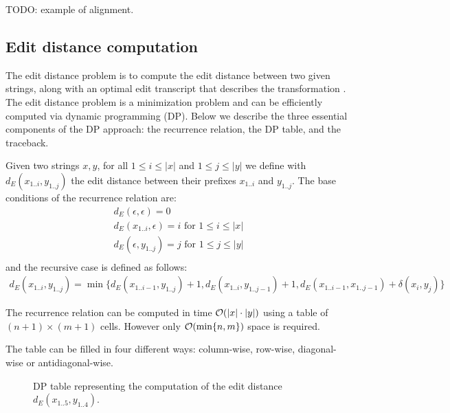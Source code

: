 \begin{example}
TODO: example of alignment.
\end{example}


\subsection{Edit distance computation}

The edit distance problem is to compute the edit distance between two given strings, along with an optimal edit transcript that describes the transformation \cite{Gusfield1997}.
The edit distance problem is a minimization problem and can be efficiently computed via dynamic programming (DP). Below we describe the three essential components of the DP approach: the recurrence relation, the DP table, and the traceback.

Given two strings $x,y$, for all $1 \leq i \leq | x |$ and $1 \leq j \leq | y |$ we define with $d_E(x_{1..i},y_{1..j})$ the edit distance between their prefixes $x_{1..i}$ and $y_{1..j}$.
The base conditions of the recurrence relation are:
\begin{eqnarray}
d_E(\epsilon,\epsilon) = 0\\
d_E(x_{1..i},\epsilon) = i \text{ for } 1 \leq i \leq |x|\\
d_E(\epsilon, y_{1..j}) = j \text{ for } 1 \leq j \leq |y|\\
\end{eqnarray}
and the recursive case is defined as follows:
\begin{eqnarray}
d_E(x_{1..i},y_{1..j}) = \min \{ d_E(x_{1..i-1},y_{1..j})+1, d_E(x_{1..i},y_{1..j-1})+1, d_E(x_{1..i-1},x_{1..j-1}) + \delta(x_i, y_j)\}
\end{eqnarray}

The recurrence relation can be computed in time $\mathcal{O}(| x | \cdot | y |)$ using a table of $(n+1) \times (m+1)$ cells. However only $\mathcal{O}(\text{min}\{ n, m \})$ space is required.

The table can be filled in four different ways: column-wise, row-wise, diagonal-wise or antidiagonal-wise.

\begin{figure}[h]
\begin{center}
\caption{DP table representing the computation of the edit distance $d_E(x_{1..5}, y_{1..4})$.}
\label{fig:edit-dp}

\end{center}
\end{figure}


